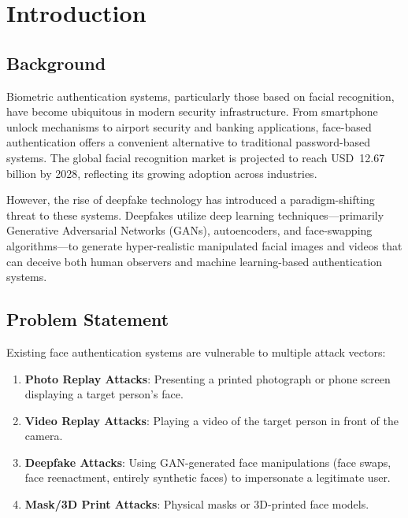 \documentclass[conference,10pt]{IEEEtran}
\begin{document}

\section{Introduction}

\subsection{Background}

Biometric authentication systems, particularly those based on facial recognition, have become ubiquitous in modern security infrastructure. From smartphone unlock mechanisms to airport security and banking applications, face-based authentication offers a convenient alternative to traditional password-based systems. The global facial recognition market is projected to reach USD~12.67 billion by 2028, reflecting its growing adoption across industries.

However, the rise of deepfake technology has introduced a paradigm-shifting threat to these systems. Deepfakes utilize deep learning techniques---primarily Generative Adversarial Networks (GANs), autoencoders, and face-swapping algorithms---to generate hyper-realistic manipulated facial images and videos that can deceive both human observers and machine learning-based authentication systems.

\subsection{Problem Statement}

Existing face authentication systems are vulnerable to multiple attack vectors:

\begin{enumerate}
    \item \textbf{Photo Replay Attacks}: Presenting a printed photograph or phone screen displaying a target person's face.
    \item \textbf{Video Replay Attacks}: Playing a video of the target person in front of the camera.
    \item \textbf{Deepfake Attacks}: Using GAN-generated face manipulations (face swaps, face reenactment, entirely synthetic faces) to impersonate a legitimate user.
    \item \textbf{Mask/3D Print Attacks}: Physical masks or 3D-printed face models.
\end{enumerate}
\end{document}
